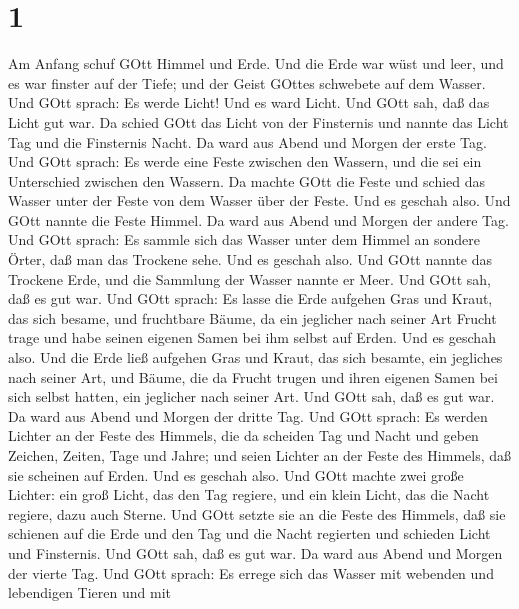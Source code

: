 \hypertarget{section}{%
\section{1}\label{section}}

 Am Anfang schuf GOtt Himmel und Erde.  Und die
Erde war wüst und leer, und es war finster auf der Tiefe; und der Geist
GOttes schwebete auf dem Wasser.  Und GOtt sprach: Es werde
Licht! Und es ward Licht.  Und GOtt sah, daß das Licht gut
war. Da schied GOtt das Licht von der Finsternis  und nannte
das Licht Tag und die Finsternis Nacht. Da ward aus Abend und Morgen der
erste Tag.  Und GOtt sprach: Es werde eine Feste zwischen
den Wassern, und die sei ein Unterschied zwischen den Wassern.
 Da machte GOtt die Feste und schied das Wasser unter der
Feste von dem Wasser über der Feste. Und es geschah also. 
Und GOtt nannte die Feste Himmel. Da ward aus Abend und Morgen der
andere Tag.  Und GOtt sprach: Es sammle sich das Wasser
unter dem Himmel an sondere Örter, daß man das Trockene sehe. Und es
geschah also.  Und GOtt nannte das Trockene Erde, und die
Sammlung der Wasser nannte er Meer. Und GOtt sah, daß es gut war.
 Und GOtt sprach: Es lasse die Erde aufgehen Gras und
Kraut, das sich besame, und fruchtbare Bäume, da ein jeglicher nach
seiner Art Frucht trage und habe seinen eigenen Samen bei ihm selbst auf
Erden. Und es geschah also.  Und die Erde ließ aufgehen
Gras und Kraut, das sich besamte, ein jegliches nach seiner Art, und
Bäume, die da Frucht trugen und ihren eigenen Samen bei sich selbst
hatten, ein jeglicher nach seiner Art. Und GOtt sah, daß es gut war.
 Da ward aus Abend und Morgen der dritte Tag. 
Und GOtt sprach: Es werden Lichter an der Feste des Himmels, die da
scheiden Tag und Nacht und geben Zeichen, Zeiten, Tage und Jahre;
 und seien Lichter an der Feste des Himmels, daß sie
scheinen auf Erden. Und es geschah also.  Und GOtt machte
zwei große Lichter: ein groß Licht, das den Tag regiere, und ein klein
Licht, das die Nacht regiere, dazu auch Sterne.  Und GOtt
setzte sie an die Feste des Himmels, daß sie schienen auf die Erde
 und den Tag und die Nacht regierten und schieden Licht und
Finsternis. Und GOtt sah, daß es gut war.  Da ward aus
Abend und Morgen der vierte Tag.  Und GOtt sprach: Es
errege sich das Wasser mit webenden und lebendigen Tieren und mit
